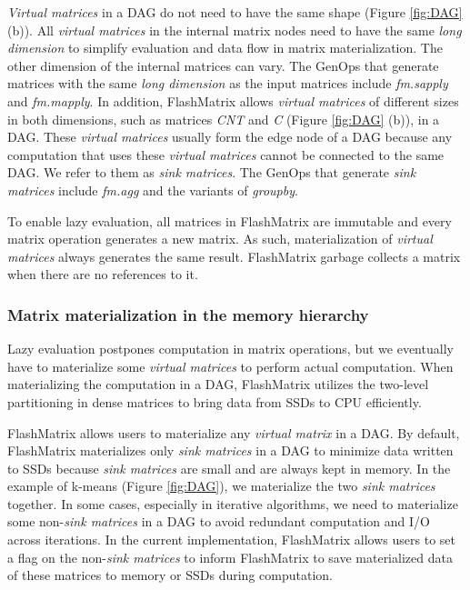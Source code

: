 \textit{Virtual matrices} in a DAG do not need to have
the same shape (Figure \ref{fig:DAG} (b)). All \textit{virtual matrices} in
the internal matrix nodes need to have the same \textit{long dimension} to
simplify evaluation and data flow in matrix materialization. The other dimension
of the internal matrices can vary. The GenOps that generate matrices with
the same \textit{long dimension} as the input matrices include
\textit{fm.sapply} and \textit{fm.mapply}. In addition, FlashMatrix allows
\textit{virtual matrices} of different sizes in both dimensions, such as
matrices \textit{CNT} and \textit{C} (Figure \ref{fig:DAG} (b)), in a DAG.
These \textit{virtual matrices} usually form the edge node of a DAG because
any computation that uses these \textit{virtual matrices} cannot be connected
to the same DAG.  We refer to them as \textit{sink matrices}. The GenOps that
generate \textit{sink matrices} include \textit{fm.agg} and the variants of
\textit{groupby}.

To enable lazy evaluation, all matrices in FlashMatrix are immutable and every
matrix operation generates a new matrix. As such, materialization of
\textit{virtual matrices} always generates the same result. FlashMatrix
garbage collects a matrix when there are no references to it.

\subsubsection{Matrix materialization in the memory hierarchy} \label{sec:materialize}
Lazy evaluation postpones computation in matrix operations, but we eventually
have to materialize some \textit{virtual matrices} to perform actual computation.
When materializing the computation in a DAG, FlashMatrix utilizes the two-level
partitioning in dense matrices to bring data from SSDs to CPU efficiently.

FlashMatrix allows users to materialize any \textit{virtual matrix} in a DAG.
By default, FlashMatrix materializes only \textit{sink matrices} in a DAG to
minimize data written to SSDs because \textit{sink matrices} are small and
are always kept in memory. In the example of k-means (Figure \ref{fig:DAG}),
we materialize the two \textit{sink matrices} together. In some cases,
especially in iterative algorithms,
we need to materialize some non-\textit{sink matrices} in a DAG to avoid
redundant computation and I/O across iterations. In the current implementation,
FlashMatrix allows users to set a flag on the
non-\textit{sink matrices} to inform FlashMatrix to save materialized data
of these matrices to memory or SSDs during computation.

